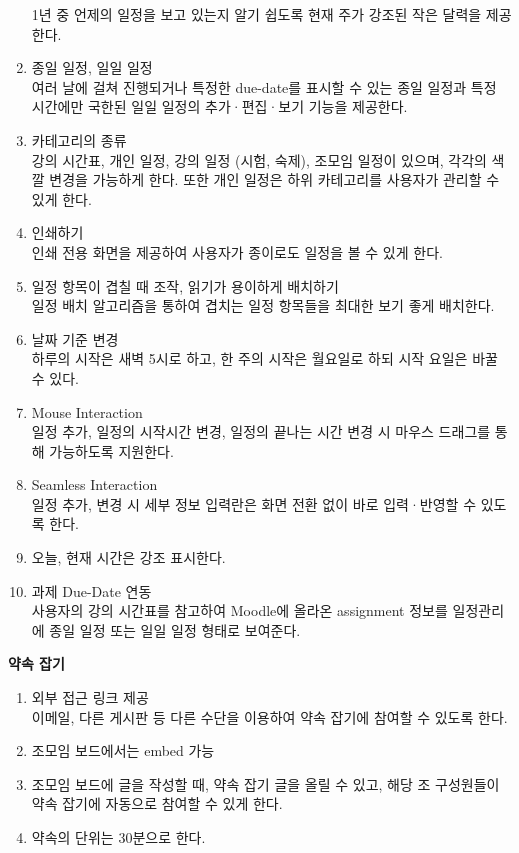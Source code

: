 \documentclass[a4paper,titlepage]{article}
\begin{document}
\begin{funcreq}
\begin{enumerate}
		1년 중 언제의 일정을 보고 있는지 알기 쉽도록 현재 주가 강조된 작은 달력을 제공한다.
		\item 종일 일정, 일일 일정\\
		여러 날에 걸쳐 진행되거나 특정한 due-date를 표시할 수 있는 종일 일정과 특정 시간에만 국한된 일일 일정의 추가·편집·보기 기능을 제공한다.
		\item 카테고리의 종류\\
		강의 시간표, 개인 일정, 강의 일정 (시험, 숙제), 조모임 일정이 있으며, 각각의 색깔 변경을 가능하게 한다. 또한 개인 일정은 하위 카테고리를 사용자가 관리할 수 있게 한다.
		\item 인쇄하기\\
		인쇄 전용 화면을 제공하여 사용자가 종이로도 일정을 볼 수 있게 한다.
		\item 일정 항목이 겹칠 때 조작, 읽기가 용이하게 배치하기\\
		일정 배치 알고리즘을 통하여 겹치는 일정 항목들을 최대한 보기 좋게 배치한다.
		\item 날짜 기준 변경\\
		하루의 시작은 새벽 5시로 하고, 한 주의 시작은 월요일로 하되 시작 요일은 바꿀 수 있다.
		\item Mouse Interaction\\
		일정 추가, 일정의 시작시간 변경, 일정의 끝나는 시간 변경 시 마우스 드래그를 통해 가능하도록 지원한다.
		\item Seamless Interaction\\
		일정 추가, 변경 시 세부 정보 입력란은 화면 전환 없이 바로 입력·반영할 수 있도록 한다.
		\item 오늘, 현재 시간은 강조 표시한다.
		\item 과제 Due-Date 연동\\
		사용자의 강의 시간표를 참고하여 Moodle에 올라온 assignment 정보를 일정관리에 종일 일정 또는 일일 일정 형태로 보여준다. 
	\end{enumerate}
	\item\textbf{약속 잡기}
	\begin{enumerate}
		\item 외부 접근 링크 제공\\
		이메일, 다른 게시판 등 다른 수단을 이용하여 약속 잡기에 참여할 수 있도록 한다.
		\item 조모임 보드에서는 embed 가능
		\item 조모임 보드에 글을 작성할 때, 약속 잡기 글을 올릴 수 있고, 해당 조 구성원들이 약속 잡기에 자동으로 참여할 수 있게 한다.
		\item 약속의 단위는 30분으로 한다.

\end{enumerate}
\end{funcreq}
\end{document}
